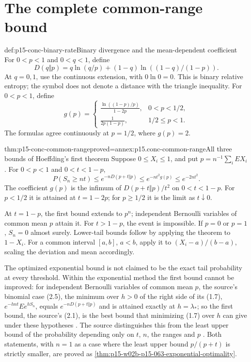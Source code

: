 \section{The complete common-range bound}

\begin{hbdefinition}{def:p15-conc-binary-rate}{Binary divergence and the mean-dependent coefficient}
For \(0<p<1\) and \(0<q<1\), define
\[
 D(q\Vert p)=q\ln(q/p)+(1-q)\ln((1-q)/(1-p)).
\]
At \(q=0,1\), use the continuous extension, with \(0\ln0=0\).
This is binary relative entropy; the symbol does not denote a
distance with the triangle inequality.
For \(0<p<1\), define
\[
 g(p)=
 \begin{cases}
 \displaystyle\frac{\ln((1-p)/p)}{1-2p},&0<p<1/2,\\[4pt]
 \displaystyle\frac{1}{2p(1-p)},&1/2\leq p<1.
 \end{cases}
\]
The formulas agree continuously at \(p=1/2\), where \(g(p)=2\).
\end{hbdefinition}

\begin{hbtheorem}{thm:p15-conc-common-range}{proved=annex:p15.conc-common-range}{All three bounds of Hoeffding's first theorem}
Suppose \(0\leq X_i\leq1\), and put
\(p=n^{-1}\sum_i EX_i\). For \(0<p<1\) and \(0<t<1-p\),
\[
 P(S_n\geq nt)
 \leq e^{-nD(p+t\Vert p)}
 \leq e^{-nt^2g(p)}
 \leq e^{-2nt^2}.
\]
The coefficient \(g(p)\) is the infimum of
\(D(p+t\Vert p)/t^2\) on \(0<t<1-p\).
For \(p<1/2\) it is attained at \(t=1-2p\);
for \(p\geq1/2\) it is the limit as \(t\downarrow0\).

At \(t=1-p\), the first bound extends to \(p^n\);
independent Bernoulli variables of common mean \(p\) attain it.
For \(t>1-p\), the event is impossible.
If \(p=0\) or \(p=1\), \(S_n=0\) almost surely.
Lower-tail bounds follow by applying the theorem to \(1-X_i\).
For a common interval \([a,b]\), \(a<b\), apply it to
\((X_i-a)/(b-a)\), scaling the deviation and mean accordingly.

The optimized exponential bound is not claimed to be the exact
tail probability at every threshold.
Within the exponential method the first bound cannot be improved: for
independent Bernoulli variables of common mean \(p\), the source's
binomial case (2.5), the minimum over \(h>0\) of the right side of its
(1.7), \(e^{-hnt}Ee^{hS_n}\), equals \(e^{-nD(p+t\Vert p)}\) and is
attained exactly at \(h=\lambda_*\); so the first bound, the source's
(2.1), is the best bound that minimizing (1.7) over \(h\) can give under
these hypotheses \cite[p.~15]{Hoeffding1963BoundedSums}. The source
distinguishes this from the least upper bound of the probability
depending only on \(t\), \(n\), the ranges and \(p\)
\cite[p.~14 and n.~3]{Hoeffding1963BoundedSums}.
Both statements, with \(n=1\) as a case where the least upper bound
\(p/(p+t)\) is strictly smaller, are proved as
\cref{thm:p15-w02b-p15-063-exponential-optimality}.
\end{hbtheorem}

